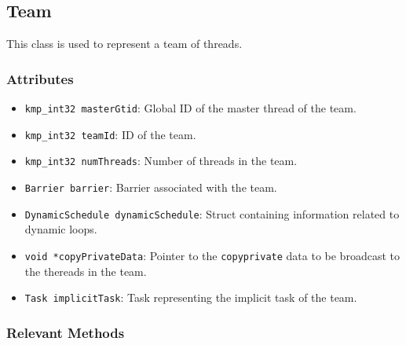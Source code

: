 \subsection{Team}

This class is used to represent a team of threads.

\subsubsection{Attributes}

\begin{itemize}
	\item \texttt{kmp_int32 masterGtid}: Global ID of the master thread of the team.
	\item \texttt{kmp_int32 teamId}: ID of the team.
	\item \texttt{kmp_int32 numThreads}: Number of threads in the team.
	\item \texttt{Barrier barrier}: Barrier associated with the team.
	\item \texttt{DynamicSchedule dynamicSchedule}: Struct containing information related to dynamic
	      loops.
	\item \texttt{void *copyPrivateData}: Pointer to the \texttt{copyprivate} data to be
	      broadcast to the thereads in the team.
	\item \texttt{Task implicitTask}: Task representing the implicit task of the team.
\end{itemize}

\subsubsection{Relevant Methods}

